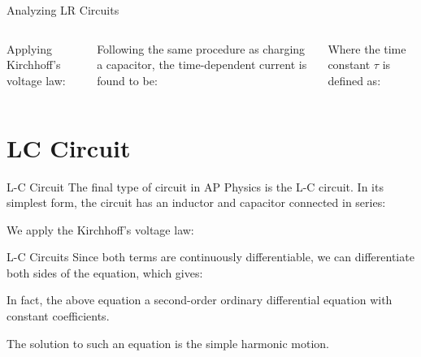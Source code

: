 \documentclass[12pt,aspectratio=169]{beamer}
\begin{document}
\begin{frame}{Analyzing LR Circuits}
  \begin{columns}

    Applying Kirchhoff's voltage law:


    Following the same procedure as charging a capacitor, the time-dependent
    current is found to be:


    Where the time constant $\tau$ is defined as:
    
  \end{columns}
\end{frame}



\section{LC Circuit}

\begin{frame}{L-C Circuit}
  The final type of circuit in AP Physics is the L-C circuit. In its simplest
  form, the circuit has an inductor and capacitor connected in series:
  \begin{center}
  \end{center}
  We apply the Kirchhoff's voltage law:
  
\end{frame}



\begin{frame}{L-C Circuits}
  Since both terms are continuously differentiable, we can differentiate both
  sides of the equation, which gives:


  In fact, the above equation a second-order ordinary differential equation
  with constant coefficients.


  The solution to such an equation is the simple harmonic motion.

\end{frame}
\end{document}
